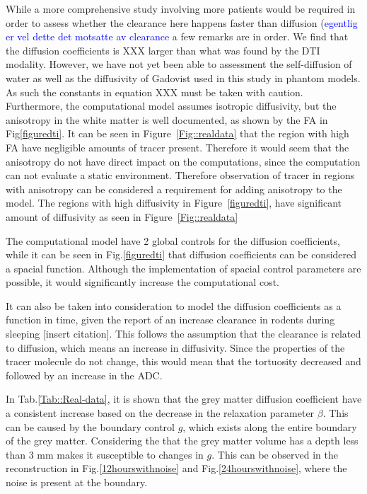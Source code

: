 \documentclass[11pt,a4paper]{article}
\newcommand{\kam}[1]{\textcolor{blue}{#1}}
\begin{document}
While a more comprehensive study involving more patients would be required in order to assess whether the clearance here happens faster than diffusion (\kam{egentlig er
vel dette det motsatte av clearance} a few remarks are in order. We find that the diffusion coefficients is XXX larger than what was found by the DTI modality.  
However, we have not yet been able to assessment the self-diffusion of water as well as the diffusivity of Gadovist used in this study in phantom models. As such 
the constants in equation XXX must be taken with caution. Furthermore,    
the computational model assumes isotropic diffusivity, but the anisotropy in the white matter is well documented, as shown by the FA in Fig\ref{figuredti}. It can be seen in Figure~\ref{Fig::realdata} that the region with high FA have negligible amounts of tracer present. Therefore it would seem that the anisotropy do not have direct impact on the computations, since the computation can not evaluate a static environment. Therefore  observation of tracer in regions with anisotropy can be considered a requirement for adding anisotropy to the model.
The regions with high diffusivity in Figure~\ref{figuredti},  have significant amount of diffusivity as seen in Figure~\ref{Fig::realdata} 


The computational model have 2 global controls for the diffusion coefficients, while it can be seen in  Fig.\ref{figuredti} that diffusion coefficients can be considered a spacial function. Although the implementation of spacial control parameters are possible, it would significantly increase the computational cost. 
   
  
It can also be taken into consideration to model the diffusion coefficients as a function in time, given the report of an increase clearance in rodents during sleeping [insert citation]. This follows the assumption that the clearance is related to diffusion, which means an increase in diffusivity. Since the properties of the tracer molecule do not change, this would mean that the tortuosity decreased and followed by an increase in the ADC.

In Tab.\ref{Tab::Real-data}, it is shown that the grey matter diffusion coefficient have a consistent increase based on the decrease in the relaxation parameter $\beta$. This can be caused by the boundary control $g$, which exists along the entire boundary of the grey matter. Considering the that the grey matter volume has a depth less than 3 mm makes it susceptible to changes in $g$. This can be observed in the reconstruction in Fig.\ref{12hourswithnoise} and Fig.\ref{24hourswithnoise}, where the noise is present at the boundary. 
  
\end{document}
